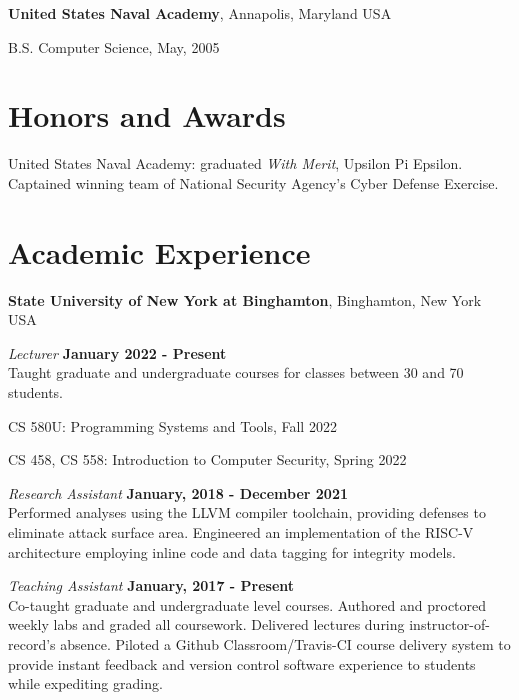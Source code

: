 \documentclass[margin,line]{res}
\begin{document}
\begin{resume}
{\bf United States Naval Academy}, Annapolis, Maryland USA\\
\vspace*{-.1in}
\begin{list2}
\item[] B.S. Computer Science,  May, 2005
\end{list2}

\section{\sc Honors and Awards}

United States Naval Academy: graduated \textit{With Merit}, Upsilon Pi Epsilon. Captained winning team of National Security Agency's Cyber Defense Exercise.


\section{\sc Academic Experience}

{\bf State University of New York at Binghamton}, Binghamton, New York USA

\vspace{-0.3cm}
{\em Lecturer} \hfill {\bf January 2022 \-- Present} \\
Taught graduate and undergraduate courses for classes between 30 and 70 students.

\begin{list2}
\item CS 580U: Programming Systems and Tools, Fall 2022
\item CS 458, CS 558: Introduction to Computer Security, Spring 2022
\end{list2}

\vspace{-0.1cm}
{\em Research Assistant} \hfill {\bf January, 2018 - December 2021}\\
Performed analyses using the LLVM compiler toolchain, providing defenses to eliminate attack surface area. Engineered an implementation of the RISC-V architecture employing inline code and data tagging for integrity models.

\vspace{-.1cm}
{\em Teaching Assistant} \hfill {\bf January, 2017 \-- Present}\\
Co-taught graduate and undergraduate level courses. Authored and proctored weekly labs and graded all coursework. Delivered lectures during instructor-of-record's absence. Piloted a Github Classroom/Travis-CI course delivery system to provide instant feedback and version control software experience to students while expediting grading.


\end{resume}
\end{document}
